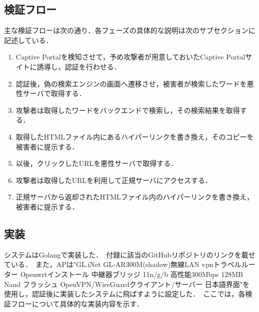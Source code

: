 \documentclass[dvipdfmx,twocolumn,9pt]{jsarticle}
\begin{document}
        \subsection{検証フロー}
            主な検証フローは次の通り．各フェーズの具体的な説明は次のサブセクションに記述している．
            \begin{enumerate}
                \item Captive Portalを検知させて，予め攻撃者が用意しておいたCaptive Portalサイトに誘導し，認証を行わせる．
                \item 認証後，偽の検索エンジンの画面へ遷移させ，被害者が検索したワードを悪性サーバで取得する．
                \item 攻撃者は取得したワードをバックエンドで検索し，その検索結果を取得する．
                \item 取得したHTMLファイル内にあるハイパーリンクを書き換え，そのコピーを被害者に提示する．
                \item 以後，クリックしたURLを悪性サーバで取得する．
                \item 攻撃者は取得したURLを利用して正規サーバにアクセスする．
                \item 正規サーバから返却されたHTMLファイル内のハイパーリンクを書き換え，被害者に提示する．
            \end{enumerate}
        \subsection{実装}
            システムはGolangで実装した．\
            付録に該当のGitHubリポジトリのリンクを載せている．\
            また，APは"GL.iNet GL-AR300M(shadow)無線LAN vpnトラベルルーター Openwrtインストール 中継器ブリッジ 11n/g/b 高性能300Mbps 128MB Nand フラッシュ OpenVPN/WireGuardクライアント/サーバー 日本語界面"を使用し，認証後に実装したシステムに飛ばすように設定した．\
            ここでは，各検証フローについて具体的な実装内容を示す．\
\end{document}
